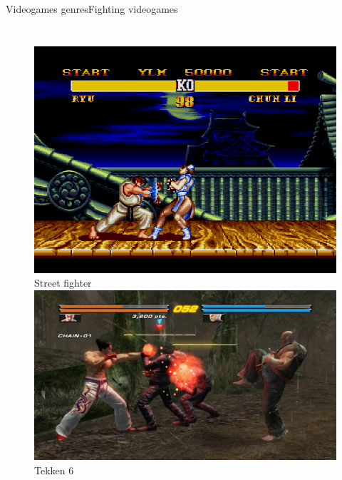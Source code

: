 \documentclass[10pt,compress]{beamer} %
\begin{document}
\begin{frame}{Videogames genres}{Fighting videogames}
\begin{columns}
   	 	\begin{figure}[t]
		\begin{center}
		    \includegraphics[width=0.9\linewidth]{figs/sf}\\Street fighter\\\smallskip
		    \includegraphics[width=0.9\linewidth]{figs/Tekken6}\\Tekken 6\\
		\end{center}
   	 	\end{figure}
    \end{columns}
\end{frame}
\end{document}
